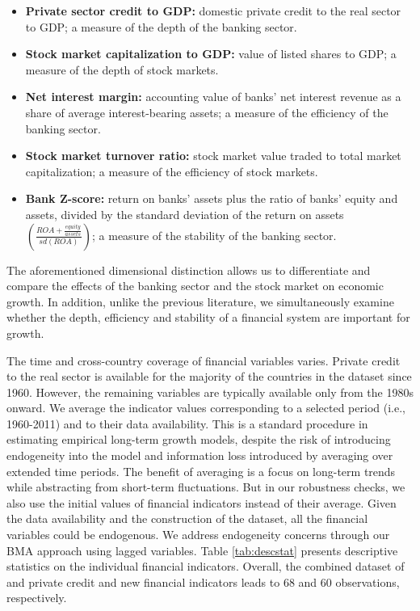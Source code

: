 \begin{itemize}
	\item \textbf{Private sector credit to GDP:} domestic private credit to the real sector to GDP; a measure of the depth of the banking sector.
	\item \textbf{Stock market capitalization to GDP:} value of listed shares to GDP; a measure of the depth of stock markets.
	\item \textbf{Net interest margin:} accounting value of banks' net interest revenue as a share of average interest-bearing assets; a measure of the efficiency of the banking sector.
	\item \textbf{Stock market turnover ratio:} stock market value traded to total market capitalization; a measure of the efficiency of stock markets.
	\item \textbf{Bank Z-score:} return on banks' assets plus the ratio of banks' equity and assets, divided by the standard deviation of the return on assets $\left(\frac{ROA + \frac{equity}{assets}}{sd(ROA)}\right)$; a measure of the stability of the banking sector.
\end{itemize} 
%
The aforementioned dimensional distinction allows us to differentiate and compare the effects of the banking sector and the stock market on economic growth. In addition, unlike the previous literature, we simultaneously examine whether the depth, efficiency and stability of a financial system are important for growth. 

The time and cross-country coverage of financial variables varies. Private credit to the real sector is available for the majority of the countries in the dataset since 1960. However, the remaining variables are typically available only from the 1980s onward. We average the indicator values corresponding to a selected period (i.e., 1960-2011) and to their data availability. This is a standard procedure in estimating empirical long-term growth models, despite the risk of introducing endogeneity into the model and information loss introduced by averaging over extended time periods. The benefit of averaging is a focus on long-term trends while abstracting from short-term fluctuations. But in our robustness checks, we also use the initial values of financial indicators instead of their average. Given the data availability and the construction of the dataset, all the financial variables could be endogenous. We address endogeneity concerns through our \ac{BMA} approach using lagged variables. Table \ref{tab:descstat} presents descriptive statistics on the individual financial indicators. Overall, the combined dataset of \citet{Fernandezetal2001} and private credit and new financial indicators leads to 68 and 60 observations, respectively.


